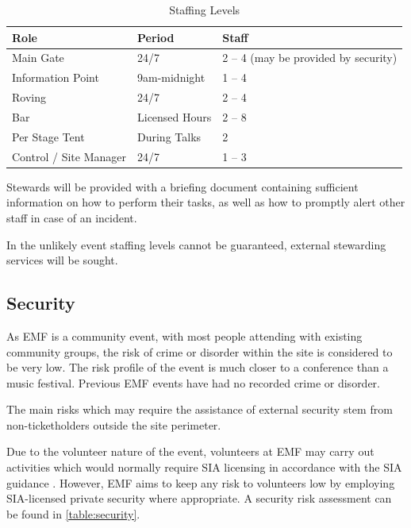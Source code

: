 \begin{table}[h!]
    \caption{Staffing Levels}
    \label{table:staff}
    \centering
    \begin{tabular}{| l l l |}
        \hline
        \textbf{Role}          & \textbf{Period} & \textbf{Staff}                       \\
        \hline
        Main Gate              & 24/7            & 2 -- 4 (may be provided by security) \\
        Information Point      & 9am-midnight    & 1 -- 4                               \\
        Roving                 & 24/7            & 2 -- 4                               \\
        Bar                    & Licensed Hours  & 2 -- 8                               \\
        Per Stage Tent         & During Talks    & 2                                    \\
        Control / Site Manager & 24/7            & 1 -- 3                               \\
        \hline
    \end{tabular}
\end{table}

Stewards will be provided with a briefing document containing sufficient information on how to perform
their tasks, as well as how to promptly alert other staff in case of an incident.

In the unlikely event staffing levels cannot be guaranteed, external stewarding services will be sought.

\subsection{Security}

As EMF is a community event, with most people attending with existing community groups, the risk of crime
or disorder within the site is considered to be very low. The risk profile of the event is much closer
to a conference than a music festival. Previous EMF events have had no recorded crime or disorder.

The main risks which may require the assistance of external security
stem from non-ticketholders outside the site perimeter.

Due to the volunteer nature of the event, volunteers at EMF may carry out activities which would normally
require SIA licensing in accordance with the SIA guidance \cite{sia}. However, EMF aims to keep any risk
to volunteers low by employing SIA-licensed private security where appropriate. A security risk assessment
can be found in \cref{table:security}.

